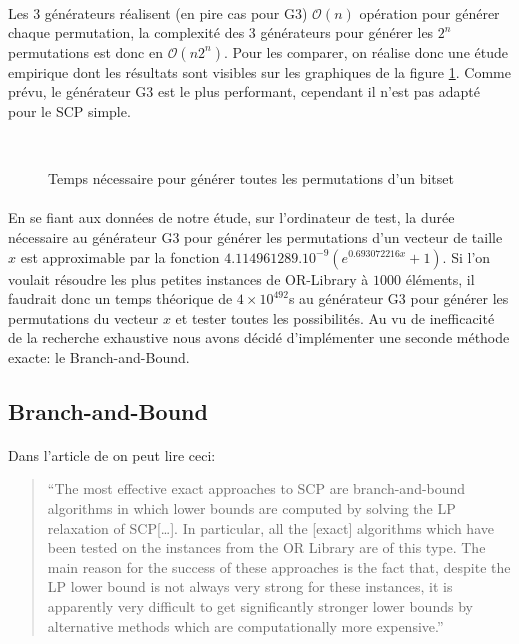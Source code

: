 \documentclass[12pt,letterpaper,twoside]{article}
\begin{document}
			\paragraph*{}
				Les 3 générateurs réalisent (en pire cas pour G3) \(\mathcal{O}(n)\) opération pour générer chaque permutation, la complexité des 3 générateurs pour générer les \(2^n\) permutations est donc en \(\mathcal{O}(n2^n)\). Pour les comparer, on réalise donc une étude empirique dont les résultats sont visibles sur les graphiques de la figure \ref{figure:plots/permutations_generators_time}. Comme prévu, le générateur G3 est le plus performant, cependant il n'est pas adapté pour le SCP simple.
			\begin{figure}[H]
				\centering
				\\
				\caption{Temps nécessaire pour générer toutes les permutations d'un bitset}
				\label{figure:plots/permutations_generators_time}
			\end{figure}
			\paragraph*{}
				En se fiant aux données de notre étude, sur l'ordinateur de test, la durée nécessaire au générateur G3 pour générer les permutations d'un vecteur de taille \(x\) est approximable par la fonction \(4.114961289.10^{-9}\left(e^{0.693072216x} + 1\right)\). Si l'on voulait résoudre les plus petites instances de OR-Library à \(1000\) éléments, il faudrait donc un temps théorique de \(4 \times 10^{492}\)s au générateur G3 pour générer les permutations du vecteur \(x\) et tester toutes les possibilités. Au vu de inefficacité de la recherche exhaustive nous avons décidé d'implémenter une seconde méthode exacte: le Branch-and-Bound.
		\subsection{Branch-and-Bound}
			\paragraph*{}
				Dans l'article  de \citeauthor{caprara2000algorithms} on peut lire ceci:
				\begin{quote}
					``The most effective exact approaches to SCP are branch-and-bound algorithms in which lower bounds are computed by solving the LP relaxation of SCP[\ldots]. In particular, all the [exact] algorithms which have been tested on the instances from the OR Library are of this type. The main reason for the success of these approaches is the fact that, despite the LP lower bound is not always very strong for these instances, it is apparently very difficult to get significantly stronger lower bounds by alternative methods which are computationally more expensive.''~\cite{caprara2000algorithms}
				\end{quote}
\end{document}
